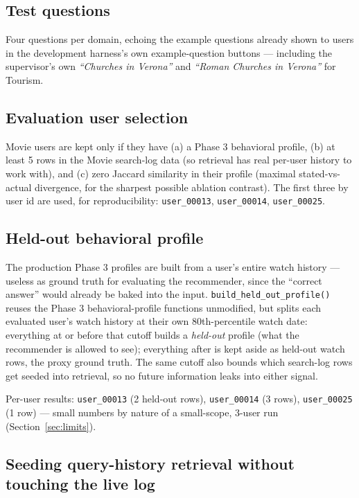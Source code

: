 \documentclass[11pt,a4paper]{article}
\newcommand{\code}[1]{\texttt{#1}}
\begin{document}
\newpage
\subsection{Test questions}

Four questions per domain, echoing the example questions already shown to users in the development
harness's own example-question buttons --- including the supervisor's own \emph{``Churches in
Verona''} and \emph{``Roman Churches in Verona''} for Tourism.

\subsection{Evaluation user selection}

Movie users are kept only if they have (a) a Phase 3 behavioral profile, (b) at least 5 rows in the
Movie search-log data (so retrieval has real per-user history to work with), and (c) zero Jaccard
similarity in their profile (maximal stated-vs-actual divergence, for the sharpest possible
ablation contrast). The first three by user id are used, for reproducibility: \code{user\_00013},
\code{user\_00014}, \code{user\_00025}.

\subsection{Held-out behavioral profile}

The production Phase 3 profiles are built from a user's entire watch history --- useless as ground
truth for evaluating the recommender, since the ``correct answer'' would already be baked into the
input. \code{build\_held\_out\_profile()} reuses the Phase 3 behavioral-profile functions
unmodified, but splits each evaluated user's watch history at their own 80th-percentile watch date:
everything at or before that cutoff builds a \emph{held-out} profile (what the recommender is
allowed to see); everything after is kept aside as held-out watch rows, the proxy ground truth. The
same cutoff also bounds which search-log rows get seeded into retrieval, so no future information
leaks into either signal.

Per-user results: \code{user\_00013} (2 held-out rows), \code{user\_00014} (3 rows),
\code{user\_00025} (1 row) --- small numbers by nature of a small-scope, 3-user run
(Section~\ref{sec:limits}).

\subsection{Seeding query-history retrieval without touching the live log}
\end{document}
